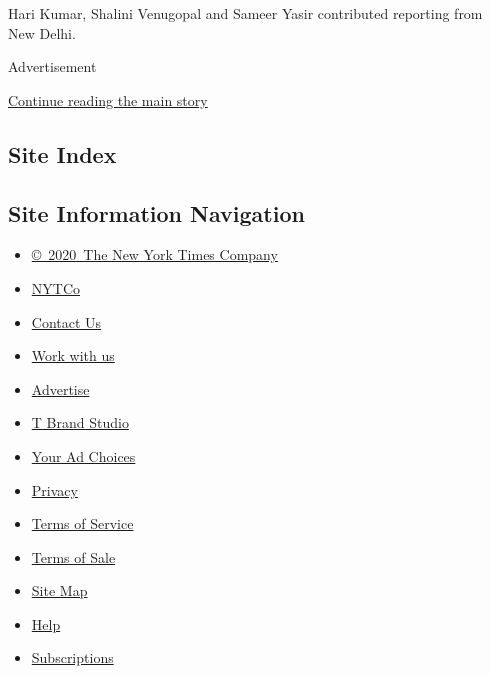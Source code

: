 Hari Kumar, Shalini Venugopal and Sameer Yasir contributed reporting
from New Delhi.

Advertisement

\protect\hyperlink{after-bottom}{Continue reading the main story}

\hypertarget{site-index}{%
\subsection{Site Index}\label{site-index}}

\hypertarget{site-information-navigation}{%
\subsection{Site Information
Navigation}\label{site-information-navigation}}

\begin{itemize}
\tightlist
\item
  \href{https://help.nytimes.com/hc/en-us/articles/115014792127-Copyright-notice}{©~2020~The
  New York Times Company}
\end{itemize}

\begin{itemize}
\tightlist
\item
  \href{https://www.nytco.com/}{NYTCo}
\item
  \href{https://help.nytimes.com/hc/en-us/articles/115015385887-Contact-Us}{Contact
  Us}
\item
  \href{https://www.nytco.com/careers/}{Work with us}
\item
  \href{https://nytmediakit.com/}{Advertise}
\item
  \href{http://www.tbrandstudio.com/}{T Brand Studio}
\item
  \href{https://www.nytimes.com/privacy/cookie-policy\#how-do-i-manage-trackers}{Your
  Ad Choices}
\item
  \href{https://www.nytimes.com/privacy}{Privacy}
\item
  \href{https://help.nytimes.com/hc/en-us/articles/115014893428-Terms-of-service}{Terms
  of Service}
\item
  \href{https://help.nytimes.com/hc/en-us/articles/115014893968-Terms-of-sale}{Terms
  of Sale}
\item
  \href{https://spiderbites.nytimes.com}{Site Map}
\item
  \href{https://help.nytimes.com/hc/en-us}{Help}
\item
  \href{https://www.nytimes.com/subscription?campaignId=37WXW}{Subscriptions}
\end{itemize}
